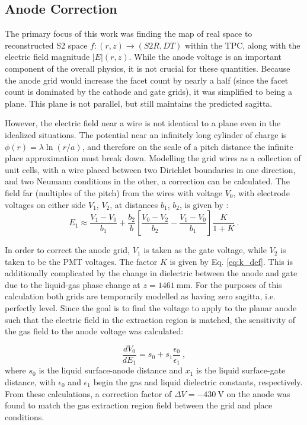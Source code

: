 \subsection{Anode Correction}
The primary focus of this work was finding the map of real space to reconstructed S2 space $f:(r,z)\rightarrow(S2R, DT)$ within the TPC, along with the electric field magnitude $|E|(r,z)$.
While the anode voltage is an important component of the overall physics, it is not crucial for these quantities.
Because the anode grid would increase the facet count by nearly a half (since the facet count is dominated by the cathode and gate grids), it was simplified to being a plane.
This plane is not parallel, but still maintains the predicted sagitta.

However, the electric field near a wire is not identical to a plane even in the idealized situations.
The potential near an infinitely long cylinder of charge is  $\phi(r) = \lambda \ln (r/a)$, and therefore on the scale of a pitch distance the infinite place approximation must break down.
Modelling the grid wires as a collection of unit cells, with a wire placed between two Dirichlet boundaries in one direction, and two Neumann conditions in the other, a correction can be calculated.
The field far (multiples of the pitch) from the wires with voltage $V_0$, with electrode voltages on either side $V_1$, $V_2$, at distances $b_1$, $b_2$, is given by
\cite{mcdonald_kirk_pdf_nodate}:
\begin{equation}
    E_1 \approx \frac{V_1 - V_0}{b_1} + \frac{b_2}{b}[\frac{V_0-V_2}{b_2} - \frac{V_1-V_0}{b_1}]\frac{K}{1+K}~.
    \label{eq:kirk_mcdonal_correction}
\end{equation}

In order to correct the anode grid, $V_1$ is taken as the gate voltage, while $V_2$ is taken to be the PMT voltages.
The factor $K$ is given by Eq. \ref{eq:k_def}.
This is additionally complicated by the change in dielectric between the anode and gate due to the liquid-gas phase change at $z=1461\mathrm{~mm}$.
For the purposes of this calculation both grids are temporarily modelled as having zero sagitta, i.e. perfectly level.
Since the goal is to find the voltage to apply to the planar anode such that the electric field in the extraction region is matched, the sensitivity of the gas field to the anode voltage was calculated:

\begin{equation}
    \frac{dV_0}{dE_1} =  s_0 + s_1 \frac{\epsilon_0}{\epsilon_1}~,
\end{equation}
\noindent
where $s_0$ is the liquid surface-anode distance and $x_1$ is the liquid surface-gate distance, with $\epsilon_0$ and $\epsilon_1$ begin the gas and liquid dielectric constants, respectively.
From these calculations, a correction factor of $\Delta V =-430\mathrm{~V}$ on the anode was found to match the gas extraction region field between the grid and place conditions.

